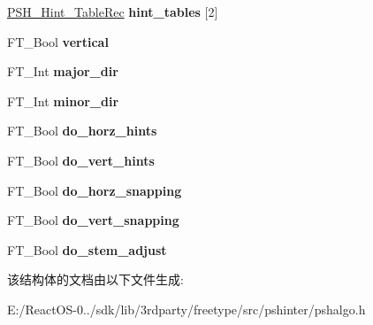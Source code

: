 \begin{DoxyCompactItemize}
\hyperlink{struct_p_s_h___hint___table_rec__}{P\+S\+H\+\_\+\+Hint\+\_\+\+Table\+Rec} {\bfseries hint\+\_\+tables} \mbox{[}2\mbox{]}
\item 
\mbox{\label{struct_p_s_h___glyph_rec___a8e46f4d12a582fdf1bb79bfef5d458f1}} 
F\+T\+\_\+\+Bool {\bfseries vertical}
\item 
\mbox{\label{struct_p_s_h___glyph_rec___aa11d8e3920a93894ef4e4c379e852f72}} 
F\+T\+\_\+\+Int {\bfseries major\+\_\+dir}
\item 
\mbox{\label{struct_p_s_h___glyph_rec___a038f2a1315e957041a969f0ee95380f2}} 
F\+T\+\_\+\+Int {\bfseries minor\+\_\+dir}
\item 
\mbox{\label{struct_p_s_h___glyph_rec___ab5785a8d814b94b34dc589b99aa8786f}} 
F\+T\+\_\+\+Bool {\bfseries do\+\_\+horz\+\_\+hints}
\item 
\mbox{\label{struct_p_s_h___glyph_rec___ad10d5dab79c9c7d5ba4ad6dcfebd355d}} 
F\+T\+\_\+\+Bool {\bfseries do\+\_\+vert\+\_\+hints}
\item 
\mbox{\label{struct_p_s_h___glyph_rec___adf38cde40c655af41a1a45a5590ff45c}} 
F\+T\+\_\+\+Bool {\bfseries do\+\_\+horz\+\_\+snapping}
\item 
\mbox{\label{struct_p_s_h___glyph_rec___aab0c5919fb0901e0b41c7fca35084044}} 
F\+T\+\_\+\+Bool {\bfseries do\+\_\+vert\+\_\+snapping}
\item 
\mbox{\label{struct_p_s_h___glyph_rec___ac9ac7c11e8e306b9cf605ff1d7f0fc56}} 
F\+T\+\_\+\+Bool {\bfseries do\+\_\+stem\+\_\+adjust}
\end{DoxyCompactItemize}


该结构体的文档由以下文件生成\+:\begin{DoxyCompactItemize}
\item 
E\+:/\+React\+O\+S-\/0../sdk/lib/3rdparty/freetype/src/pshinter/pshalgo.\+h\end{DoxyCompactItemize}
